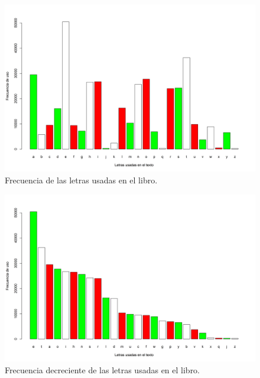 \documentclass[fontsize=12pt]{article}
\begin{document}
\begin{figure}
\centering
\includegraphics[scale=0.5]{Figures/letrasFiltradas.png}
\caption{Frecuencia de las letras usadas en el libro.}
\label{letrasfiltradas}
\end{figure}

\begin{figure}
\centering
\includegraphics[scale=0.5]{Figures/letrasFiltradasDrec.png}
\caption{Frecuencia decreciente de las letras usadas en el libro.}
\label{letrasfiltradasdecr}
\end{figure}
\end{document}
